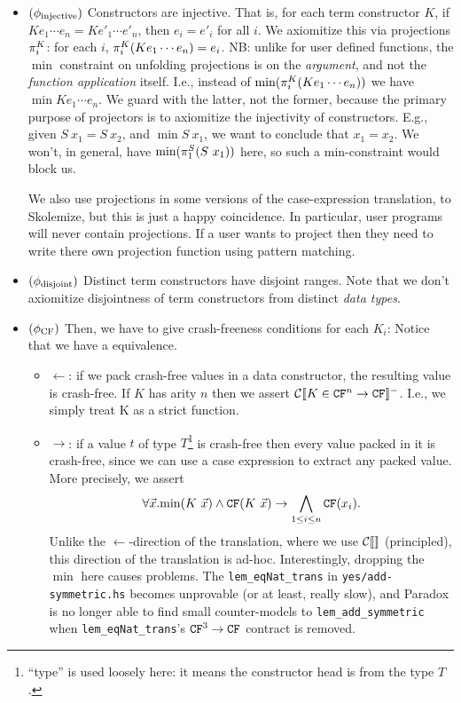 \documentclass[preprint]{sigplanconf}
\begin{document}
\begin{itemize}
\item $(\phi_\text{injective})$ Constructors are injective.  That is,
  for each term constructor $K$, if $K e_1 \cdots e_n = K e'_1 \cdots
  e'_n$, then $e_i = e'_i$ for all $i$.  We axiomitize this via
  projections $\pi_{i}^{K}$: for each $i$, $\pi_{i}^{K}(K e_1 \cdots
  e_n) = e_i$.  NB: unlike for user defined functions, the $\min{}$
  constraint on unfolding projections is on the \emph{argument}, and
  not the \emph{function application} itself.  I.e., instead of
  $\mbox{min}(\pi_{i}^{K}(K e_1 \cdots e_n))$ we have $\min{K e_1 \cdots
    e_n}$.  We guard with the latter, not the former, because the
  primary purpose of projectors is to axiomitize the injectivity of
  constructors.  E.g., given $S~x_1 = S~x_2$, and $\min{S~x_1}$, we
  want to conclude that $x_1 = x_2$.  We won't, in general, have
  $\mbox{min}(\pi_{1}^{S}(S~x_1))$ here, so such a min-constraint would
  block us.

  We also use projections in some versions of the case-expression
  translation, to Skolemize, but this is just a happy coincidence.  In
  particular, user programs will never contain projections.  If a user
  wants to project then they need to write there own projection
  function using pattern matching.
\item $(\phi_\text{disjoint})$ Distinct term constructors have
  disjoint ranges.  Note that we don't axiomitize disjointness of term
  constructors from distinct \emph{data types}.
\item $(\phi_\text{CF})$ Then, we have to give crash-freeness conditions for each $K_i$:
  Notice that we have a equivalence.
  \begin{itemize}
  \item $\gets$: if we pack crash-free values in a data constructor,
    the resulting value is crash-free.  If $K$ has arity $n$ then we
    assert $\mathcal{C} \llbracket K \in \texttt{CF}^n \to \texttt{CF} \rrbracket^-$.  I.e., we simply treat
    K as a strict \cfc function.

  \item $\to$: if a value $t$ of type $T$\footnote{ ``type'' is used
      loosely here: it means the constructor head is from the type
      $T$.  } is crash-free then every value packed in it is
    crash-free, since we can use a case expression to extract any
    packed value.  More precisely, we assert
    \[
    \forall \vec{x}. \mbox{min}(K~\vec{x}) \land \texttt{CF}(K~\vec{x})
    \to \bigwedge_{1 \le i \le n} \texttt{CF}(x_i).
    \]
    Unlike the $\gets$-direction of the translation, where we use
    $\mathcal{C} \llbracket  \rrbracket$ (principled), this direction of the translation is
    ad-hoc.  Interestingly, dropping the $\min$ here causes
    problems. The \texttt{lem\_eqNat\_trans} in
    \texttt{yes/add-symmetric.hs} becomes unprovable (or at least,
    really slow), and Paradox is no longer able to find small
    counter-models to \texttt{lem\_add\_symmetric} when
    \texttt{lem\_eqNat\_trans}'s $\texttt{CF}^3 \to \texttt{CF}$ contract is removed.


\end{itemize}
\end{itemize}
\end{document}
